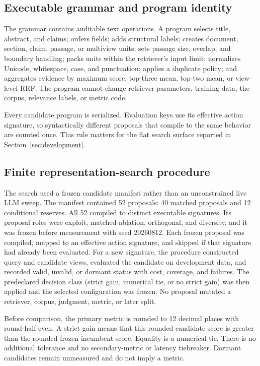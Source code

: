 \documentclass[final,5p,times,twocolumn]{elsarticle}
\begin{document}
\subsection{Executable grammar and program identity}

The grammar contains auditable text operations. A program selects title,
abstract, and claims; orders fields; adds structural labels; creates document,
section, claim, passage, or multiview units; sets passage size, overlap, and
boundary handling; packs units within the retriever's input limit; normalizes
Unicode, whitespace, case, and punctuation; applies a duplicate policy; and
aggregates evidence by maximum score, top-three mean, top-two mean, or
view-level RRF. The program cannot change retriever parameters, training data,
the corpus, relevance labels, or metric code.

Every candidate program is serialized. Evaluation keys use its effective
action signature, so syntactically different proposals that compile to the
same behavior are counted once. This rule matters for the flat search surface
reported in Section~\ref{sec:development}.

\subsection{Finite representation-search procedure}

The search used a frozen candidate manifest rather than an unconstrained live
LLM sweep. The manifest contained 52 proposals: 40 matched proposals and 12
conditional reserves. All 52 compiled to distinct executable signatures. Its
proposal roles were exploit, matched-ablation,
orthogonal, and diversity, and it was frozen before measurement with seed
20260812. Each frozen proposal was compiled, mapped to an effective action
signature, and skipped if that signature had already been evaluated. For a
new signature, the procedure constructed query and candidate views, evaluated
the candidate on development data, and recorded valid, invalid, or dormant
status with cost, coverage, and failures. The predeclared decision class
(strict gain, numerical tie, or no strict gain) was then applied and the
selected configuration was frozen. No proposal mutated a retriever, corpus,
judgment, metric, or later split.

Before comparison, the primary metric is rounded to 12 decimal places with
round-half-even. A strict gain means that this rounded candidate score is
greater than the rounded frozen incumbent score. Equality is a numerical tie.
There is no additional tolerance and no secondary-metric or latency
tiebreaker. Dormant candidates remain unmeasured and do not imply a metric.
\end{document}
